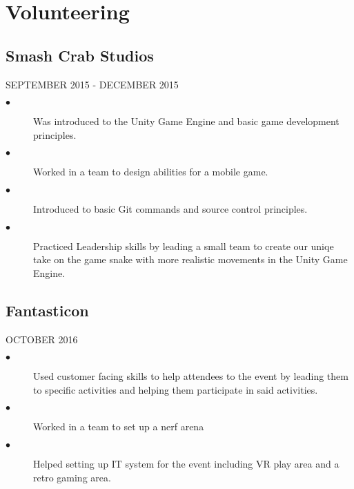 \documentclass{article}
\begin{document}
\section{Volunteering}
\noindent
\hfill
\begin{minipage}[t]{1\textwidth}
    \subsection{Smash Crab Studios}
    \footnotesize{SEPTEMBER 2015 - DECEMBER 2015}
    \normalsize{}
    \begin{description}
        \item[$\bullet$] Was introduced to the Unity Game Engine and basic game development principles. 
        \item[$\bullet$] Worked in a team to design abilities for a mobile game.  
        \item[$\bullet$] Introduced to basic Git commands and source control principles.
        \item[$\bullet$] Practiced Leadership skills by leading a small team to create our uniqe take on the game snake with more realistic movements in the Unity Game Engine. 
    \end{description}

    \subsection{Fantasticon}
    \footnotesize{OCTOBER 2016}
    \normalsize{}
    \begin{description}
        \item[$\bullet$] Used customer facing skills to help attendees to the event by leading them to specific activities and helping them participate in said activities. 
        \item[$\bullet$] Worked in a team to set up a nerf arena
        \item[$\bullet$] Helped setting up IT system for the event including VR play area and a retro gaming area. 
    \end{description}

\end{minipage}
\end{document}
